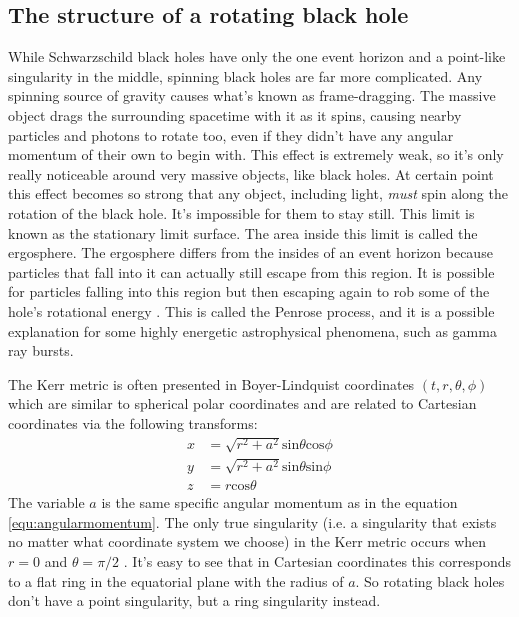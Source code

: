 \documentclass[english, oneside]{HYgradu}
\begin{document}
\subsection{The structure of a rotating black hole}

While Schwarzschild black holes have only the one event horizon and a point-like singularity in the middle, spinning black holes are far more complicated. Any spinning source of gravity causes what's known as frame-dragging. The massive object drags the surrounding spacetime with it as it spins, causing nearby particles and photons to rotate too, even if they didn't have any angular momentum of their own to begin with. This effect is extremely weak, so it's only really noticeable around very massive objects, like black holes. At certain point this effect becomes so strong that any object, including light, \textit{must} spin along the rotation of the black hole. It's impossible for them to stay still. This limit is known as the stationary limit surface. The area inside this limit is called the ergosphere. The ergosphere differs from the insides of an event horizon because particles that fall into it can actually still escape from this region. It is possible for particles falling into this region but then escaping again to rob some of the hole's rotational energy \citep{grintro}. This is called the Penrose process, and it is a possible explanation for some highly energetic astrophysical phenomena, such as gamma ray bursts. 

The Kerr metric is often presented in Boyer-Lindquist coordinates $(t, r, \theta, \phi)$ which are similar to spherical polar coordinates and are related to Cartesian coordinates via the following transforms:
\begin{align*}
x &= \sqrt{r^2 + a^2} \mathrm{sin}\theta \mathrm{cos}\phi \\
y &= \sqrt{r^2 + a^2} \mathrm{sin}\theta \mathrm{sin}\phi \\
z &= r \mathrm{cos}\theta
\end{align*}
The variable $a$ is the same specific angular momentum as in the equation \ref{equ:angularmomentum}. The only true singularity (i.e. a singularity that exists no matter what coordinate system we choose) in the Kerr metric occurs when $r=0$ and $\theta = \pi/2$ \citep{grintro}. It's easy to see that in Cartesian coordinates this corresponds to a flat ring in the equatorial plane with the radius of $a$. So rotating black holes don't have a point singularity, but a ring singularity instead.
\end{document}
